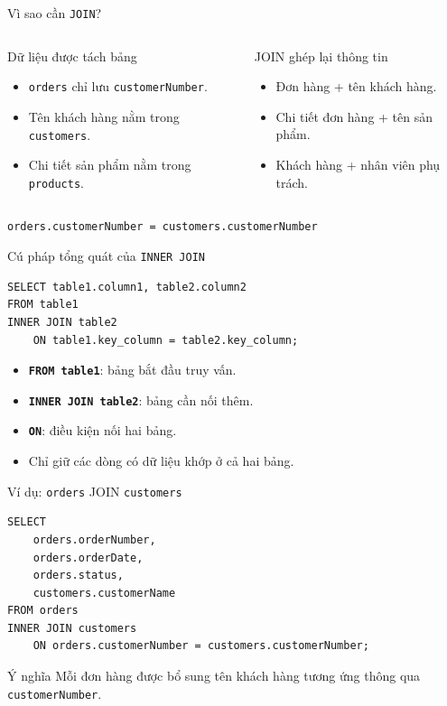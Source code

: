 \documentclass[aspectratio=169,11pt]{beamer}
\newcommand{\tbl}[1]{\texttt{#1}}
\newcommand{\col}[1]{\texttt{#1}}
\newcommand{\kw}[1]{\textbf{\texttt{#1}}}
\begin{document}
\begin{frame}{Vì sao cần \texttt{JOIN}?}
\begin{columns}[T,onlytextwidth]
\begin{block}{Dữ liệu được tách bảng}
\begin{itemize}
  \item \tbl{orders} chỉ lưu \col{customerNumber}.
  \item Tên khách hàng nằm trong \tbl{customers}.
  \item Chi tiết sản phẩm nằm trong \tbl{products}.
\end{itemize}
\end{block}
\begin{block}{JOIN ghép lại thông tin}
\begin{itemize}
  \item Đơn hàng + tên khách hàng.
  \item Chi tiết đơn hàng + tên sản phẩm.
  \item Khách hàng + nhân viên phụ trách.
\end{itemize}
\end{block}
\end{columns}
\vspace{0.5em}
\centering
\texttt{orders.customerNumber = customers.customerNumber}
\end{frame}

\begin{frame}[fragile]{Cú pháp tổng quát của \texttt{INNER JOIN}}
\begin{lstlisting}
SELECT table1.column1, table2.column2
FROM table1
INNER JOIN table2
    ON table1.key_column = table2.key_column;
\end{lstlisting}
\begin{itemize}
  \item \kw{FROM table1}: bảng bắt đầu truy vấn.
  \item \kw{INNER JOIN table2}: bảng cần nối thêm.
  \item \kw{ON}: điều kiện nối hai bảng.
  \item Chỉ giữ các dòng có dữ liệu khớp ở cả hai bảng.
\end{itemize}
\end{frame}

\begin{frame}[fragile]{Ví dụ: \texttt{orders} JOIN \texttt{customers}}
\begin{lstlisting}
SELECT
    orders.orderNumber,
    orders.orderDate,
    orders.status,
    customers.customerName
FROM orders
INNER JOIN customers
    ON orders.customerNumber = customers.customerNumber;
\end{lstlisting}
\begin{block}{Ý nghĩa}
Mỗi đơn hàng được bổ sung tên khách hàng tương ứng thông qua \col{customerNumber}.
\end{block}
\end{frame}
\end{document}
